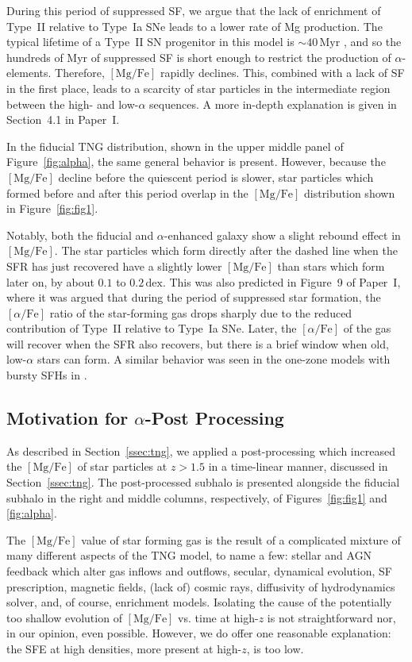 \documentclass[twocolumn,linenumbers]{aastex631}
\newcommand{\Myr}{\ensuremath{\textrm{Myr}}}
\newcommand{\MgFe}{\ensuremath{[\textrm{Mg}/\textrm{Fe}]}}
\newcommand{\alphaFe}{\ensuremath{[\alpha/\textrm{Fe}]}}
\newcommand{\dex}{\ensuremath{\textrm{dex}}}
\begin{document}
During this period of suppressed SF, we argue that the lack of enrichment of Type~II relative to Type~Ia SNe leads to a lower rate of Mg production. The typical lifetime of a Type~II SN progenitor in this model is $\sim40\,\Myr$ \citep{2018MNRAS.473.4077P}, and so the hundreds of Myr of suppressed SF is short enough to restrict the production of $\alpha$-elements. Therefore, \MgFe{} rapidly declines. This, combined with a lack of SF in the first place, leads to a scarcity of star particles in the intermediate region between the high- and low-$\alpha$ sequences. A more in-depth explanation is given in Section~4.1 in Paper~I.

In the fiducial TNG distribution, shown in the upper middle panel of Figure~\ref{fig:alpha}, the same general behavior is present. However, because the \MgFe{} decline before the quiescent period is slower, star particles which formed before and after this period overlap in the \MgFe{} distribution shown in Figure~\ref{fig:fig1}.

Notably, both the fiducial and $\alpha$-enhanced galaxy show a slight rebound effect in \MgFe{}. The star particles which form directly after the dashed line when the SFR has just recovered have a slightly lower \MgFe{} than stars which form later on, by about $0.1$ to $0.2\,\dex$. This was also predicted in Figure~9 of Paper~I, where it was argued that during the period of suppressed star formation, the \alphaFe{} ratio of the star-forming gas drops sharply due to the reduced contribution of Type~II relative to Type~Ia SNe. Later, the \alphaFe{} of the gas will recover when the SFR also recovers, but there is a brief window when old, low-$\alpha$ stars can form. A similar behavior was seen in the one-zone models with bursty SFHs in \citet{2020MNRAS.498.1364J}.

\subsection{Motivation for $\alpha$-Post Processing}\label{ssec:sfe}
As described in Section~\ref{ssec:tng}, we applied a post-processing which increased the \MgFe{} of star particles at $z>1.5$ in a time-linear manner, discussed in Section~\ref{ssec:tng}. The post-processed subhalo is presented alongside the fiducial subhalo in the right and middle columns, respectively, of Figures~\ref{fig:fig1} and \ref{fig:alpha}.

The \MgFe{} value of star forming gas is the result of a complicated mixture of many different aspects of the TNG model, to name a few: stellar and AGN feedback which alter gas inflows and outflows, secular, dynamical evolution, SF prescription, magnetic fields, (lack of) cosmic rays, diffusivity of hydrodynamics solver, and, of course, enrichment models. Isolating the cause of the potentially too shallow evolution of \MgFe{} vs. time at high-$z$ is not straightforward nor, in our opinion, even possible. However, we do offer one reasonable explanation: the SFE at high densities, more present at high-$z$, is too low.
\end{document}
